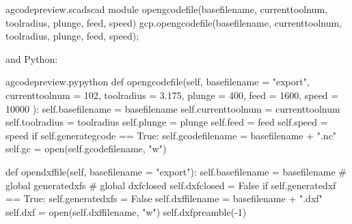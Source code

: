 \documentclass{ltxdoc}
\begin{document}
 
\lstset{firstnumber=\thegcpscad}
\begin{writecode}{a}{gcodepreview.scad}{scad}
module opengcodefile(basefilename, currenttoolnum, toolradius, plunge, feed, speed) {
    gcp.opengcodefile(basefilename, currenttoolnum, toolradius, plunge, feed, speed);
}

\end{writecode}
\addtocounter{gcpscad}{4}

\noindent and Python:

\lstset{firstnumber=\thegcpy}
\begin{writecode}{a}{gcodepreview.py}{python}
    def opengcodefile(self, basefilename = "export", 
                      currenttoolnum = 102, 
                      toolradius = 3.175, 
                      plunge = 400, 
                      feed = 1600, 
                      speed = 10000
                      ):
        self.basefilename = basefilename
        self.currenttoolnum = currenttoolnum
        self.toolradius = toolradius
        self.plunge = plunge
        self.feed = feed
        self.speed = speed
        if self.generategcode == True:
            self.gcodefilename = basefilename + ".nc"
            self.gc = open(self.gcodefilename, "w")

    def opendxffile(self, basefilename = "export"): 
        self.basefilename = basefilename
#        global generatedxfs
#        global dxfclosed
        self.dxfclosed = False
        if self.generatedxf == True:
            self.generatedxfs = False
            self.dxffilename = basefilename + ".dxf"
            self.dxf = open(self.dxffilename, "w")
            self.dxfpreamble(-1)


\end{writecode}
\end{document}
